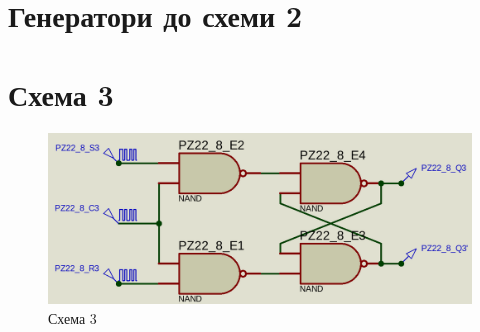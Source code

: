 \documentclass{article}
\begin{document}
\begin{normalsize}
	\section*{Генератори до схеми 2}
	\begin{figure}[H]
		\centering
		\hspace{5px}
	\end{figure}

	\section*{Схема 3}	
	\begin{figure}[H]
		\centering
		\includegraphics[scale=0.25]{s3}	
		\caption{Схема 3}
	\end{figure}
	

\end{normalsize}
\end{document}
